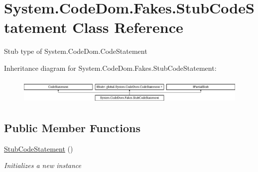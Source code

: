 \hypertarget{class_system_1_1_code_dom_1_1_fakes_1_1_stub_code_statement}{\section{System.\-Code\-Dom.\-Fakes.\-Stub\-Code\-Statement Class Reference}
\label{class_system_1_1_code_dom_1_1_fakes_1_1_stub_code_statement}
}


Stub type of System.\-Code\-Dom.\-Code\-Statement 


Inheritance diagram for System.\-Code\-Dom.\-Fakes.\-Stub\-Code\-Statement\-:\begin{figure}[H]
\begin{center}
\leavevmode
\includegraphics[height=1.257015cm]{class_system_1_1_code_dom_1_1_fakes_1_1_stub_code_statement}
\end{center}
\end{figure}
\subsection*{Public Member Functions}
\begin{DoxyCompactItemize}
\item 
\hyperlink{class_system_1_1_code_dom_1_1_fakes_1_1_stub_code_statement_a15b92eb04de90efee1e142b79e7d3591}{Stub\-Code\-Statement} ()
\begin{DoxyCompactList}\small\item\em Initializes a new instance\end{DoxyCompactList}\end{DoxyCompactItemize}

